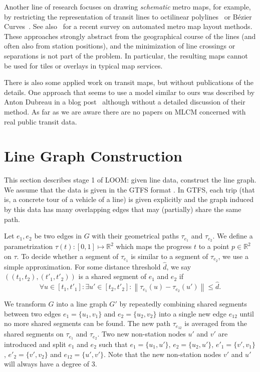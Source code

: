 \documentclass[sigconf]{acmart}
\begin{document}
Another line of research focuses on drawing \emph{schematic} metro maps, for example, by restricting the representation of transit lines to octilinear polylines~\cite{hon06} or B\'ezier Curves~\cite{fin12}. See also~\cite{nol14} for a recent survey on automated metro map layout methods. These approaches strongly abstract from the geographical course of the lines (and often also from station positions), and the minimization of line crossings or separations is not part of the problem.
In particular, the resulting maps cannot be used for tiles or overlays in typical map services.

There is also some applied work on transit maps, but without publications of the details.
One approach that seems to use a model similar to ours was described by Anton Dubreau in a blog post~\cite{dub16} although without a detailed discussion of their method. As far as we are aware there are no papers on MLCM concerned with real public transit data.

%
\section{Line Graph Construction}\label{SEC:graph}
%

This section describes stage 1 of LOOM: given line data, construct the line graph.
We assume that the data is given in the GTFS format \cite{gtfs}.
In GTFS, each trip (that is, a concrete tour of a vehicle of a line) is given explicitly and the graph induced by this data has many overlapping edges that may (partially) share the same path.

Let $e_1, e_2$ be two edges in $G$ with their geometrical paths $\tau_{e_1}$ and $\tau_{e_2}$. We define a parametrization $\tau(t): [0,1] \mapsto \mathbb{R}^2$ which maps the progress $t$ to a point $p \in \mathbb{R}^2$ on $\tau$. To decide whether a segment of $\tau_{e_1}$ is similar to a segment of $\tau_{e_2}$, we use a simple approximation. For some distance threshold $\hat{d}$, we say $\left(\left(t_1, t_2\right), \left({t'}_1, {t'}_2\right)\right)$ is a shared segment of $e_1$ and $e_2$ if
\begin{equation}
	\forall u \in [t_1, {t'}_1]: \exists u' \in [t_2, {t'}_2]:\left\|\tau_{e_1}\left(u\right) - \tau_{e_2}\left(u'\right)\right\| \leq \hat{d}.
\end{equation}

We transform $G$ into a line graph $G'$ by repeatedly combining shared segments between two edges $e_1 = \{u_1, v_1\}$ and $e_2 = \{u_2, v_2\}$ into a single new edge $e_{12}$ until no more shared segments can be found. The new path $\tau_{e_{12}}$ is averaged from the shared segments on $\tau_{e_1}$ and $\tau_{e_2}$. Two new non-station nodes $u'$ and $v'$ are introduced and split $e_1$ and $e_2$ such that $e_1 = \{u_1, u'\}$, $e_2 = \{u_2, u'\}$, $e'_1 = \{v', v_1\}$, $e'_2 = \{v', v_2\}$ and $e_{12} = \{u', v'\}$. Note that the new non-station nodes $v'$ and $u'$ will always have a degree of 3.
\end{document}
